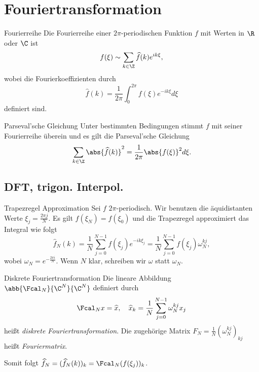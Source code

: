\section{Fouriertransformation}

\begin{karte}{Fourierreihe}
    Die Fourierreihe einer \( 2\pi \)-periodischen Funktion \(f\) 
    mit Werten in \(\R\) oder \(\C\) ist 
    \[ f(\xi) \sim \sum_{k\in\Z} \widehat{f}(k) e^{ik\xi}, \]
    wobei die Fourierkoeffizienten durch 
    \[ \widehat{f}(k) = \frac{1}{2\pi} \int_0^{2\pi} f(\xi) e^{-ik\xi} d\xi \]
    definiert sind.
\end{karte}

\begin{karte}{Parseval'sche Gleichung}
    Unter bestimmten Bedingungen stimmt \(f\) mit seiner Fourierreihe überein 
    und es gilt die Parseval'sche Gleichung
    \[ \sum_{k\in\Z} \abs{\widehat{f}(k)}^2 = \frac{1}{2\pi} \abs{f(\xi)}^2 d\xi. \]
\end{karte}

\subsection{DFT, trigon. Interpol.}

\begin{karte}{Trapezregel Approximation}
    Sei \(f\) \(2\pi\)-periodisch. Wir benutzen die äquidistanten Werte 
    \( \xi_j = \frac{2\pi j}{N} \). Es gilt \( f(\xi_N) = f(\xi_0) \)
    und die Trapezregel approximiert das Integral wie folgt 
    \[ \widehat{f}_N(k) = \frac{1}{N} \sum_{j=0}^{N-1} f(\xi_j) e^{-ik\xi_j} 
    = \frac{1}{N} \sum_{j=0}^{N-1} f(\xi_j) \omega_N^{kj}, \]
    wobei \( \omega_N = e^{-\frac{2\pi i}{N}} \). Wenn \(N\) klar, 
    schreiben wir \(\omega\) statt \(\omega_N\). 
\end{karte}

\begin{karte}{Diskrete Fouriertransformation}
    Die lineare Abbildung \( \abb{\Fcal_N}{\C^N}{\C^N} \)
    definiert durch 
    \[ \Fcal_N x = \widehat{x}, \quad 
    \widehat{x}_k = \frac{1}{N} \sum_{j=0}^{N-1} \omega_N^{kj} x_j \]
    heißt \textit{diskrete Fouriertransformation}. 
    Die zugehörige Matrix \( F_N = \frac{1}{N} (\omega_N^{kj})_{kj} \) 
    heißt \textit{Fouriermatrix}.

    Somit folgt \( \widehat{f}_N = (\widehat{f}_N(k))_k = \Fcal_N(f(\xi_j))_k \).
\end{karte}

